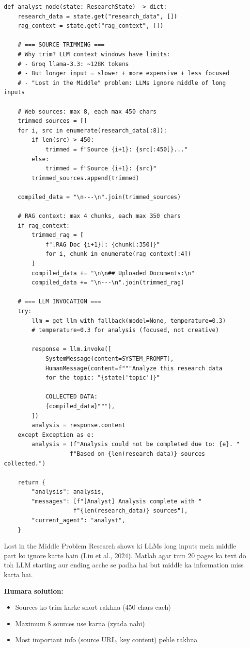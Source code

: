 \documentclass[11pt,a4paper,twoside]{report}
\begin{document}
\begin{lstlisting}[style=pythonstyle,caption={analyst.py --- How data is prepared for LLM}]
def analyst_node(state: ResearchState) -> dict:
    research_data = state.get("research_data", [])
    rag_context = state.get("rag_context", [])

    # === SOURCE TRIMMING ===
    # Why trim? LLM context windows have limits:
    # - Groq llama-3.3: ~128K tokens
    # - But longer input = slower + more expensive + less focused
    # - "Lost in the Middle" problem: LLMs ignore middle of long inputs

    # Web sources: max 8, each max 450 chars
    trimmed_sources = []
    for i, src in enumerate(research_data[:8]):
        if len(src) > 450:
            trimmed = f"Source {i+1}: {src[:450]}..."
        else:
            trimmed = f"Source {i+1}: {src}"
        trimmed_sources.append(trimmed)

    compiled_data = "\n---\n".join(trimmed_sources)

    # RAG context: max 4 chunks, each max 350 chars
    if rag_context:
        trimmed_rag = [
            f"[RAG Doc {i+1}]: {chunk[:350]}"
            for i, chunk in enumerate(rag_context[:4])
        ]
        compiled_data += "\n\n## Uploaded Documents:\n"
        compiled_data += "\n---\n".join(trimmed_rag)

    # === LLM INVOCATION ===
    try:
        llm = get_llm_with_fallback(model=None, temperature=0.3)
        # temperature=0.3 for analysis (focused, not creative)

        response = llm.invoke([
            SystemMessage(content=SYSTEM_PROMPT),
            HumanMessage(content=f"""Analyze this research data
            for the topic: "{state['topic']}"

            COLLECTED DATA:
            {compiled_data}"""),
        ])
        analysis = response.content
    except Exception as e:
        analysis = (f"Analysis could not be completed due to: {e}. "
                   f"Based on {len(research_data)} sources collected.")

    return {
        "analysis": analysis,
        "messages": [f"[Analyst] Analysis complete with "
                    f"{len(research_data)} sources"],
        "current_agent": "analyst",
    }
\end{lstlisting}

\begin{conceptbox}{Lost in the Middle Problem}
Research shows ki LLMs long inputs mein middle part ko ignore karte hain (Liu et al., 2024). Matlab agar tum 20 pages ka text do toh LLM starting aur ending acche se padha hai but middle ka information miss karta hai.

\textbf{Humara solution:}
\begin{itemize}
    \item Sources ko trim karke short rakhna (450 chars each)
    \item Maximum 8 sources use karna (zyada nahi)
    \item Most important info (source URL, key content) pehle rakhna
\end{itemize}
\end{conceptbox}
\end{document}
